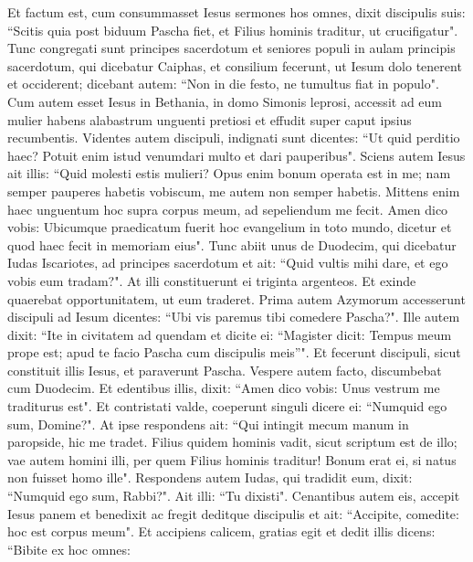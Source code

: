 \begin{biblechapter}  
\verse Et factum est, cum consummasset Iesus sermones hos omnes, dixit discipulis suis: 
\verse “Scitis quia post biduum Pascha fiet, et Filius hominis traditur, ut crucifigatur". 
\verse Tunc congregati sunt principes sacerdotum et seniores populi in aulam principis sacerdotum, qui dicebatur Caiphas, 
\verse et consilium fecerunt, ut Iesum dolo tenerent et occiderent; 
\verse dicebant autem: “Non in die festo, ne tumultus fiat in populo". 
\verse Cum autem esset Iesus in Bethania, in domo Simonis leprosi, 
\verse accessit ad eum mulier habens alabastrum unguenti pretiosi et effudit super caput ipsius recumbentis. 
\verse Videntes autem discipuli, indignati sunt dicentes: “Ut quid perditio haec? 
\verse Potuit enim istud venumdari multo et dari pauperibus".  
\verse Sciens autem Iesus ait illis: “Quid molesti estis mulieri? Opus enim bonum operata est in me; 
\verse nam semper pauperes habetis vobiscum, me autem non semper habetis. 
\verse Mittens enim haec unguentum hoc supra corpus meum, ad sepeliendum me fecit. 
\verse Amen dico vobis: Ubicumque praedicatum fuerit hoc evangelium in toto mundo, dicetur et quod haec fecit in memoriam eius". 
\verse Tunc abiit unus de Duodecim, qui dicebatur Iudas Iscariotes, ad principes sacerdotum 
\verse et ait: “Quid vultis mihi dare, et ego vobis eum tradam?". At illi constituerunt ei triginta argenteos. 
\verse Et exinde quaerebat opportunitatem, ut eum traderet. 
\verse Prima autem Azymorum accesserunt discipuli ad Iesum dicentes: “Ubi vis paremus tibi comedere Pascha?". 
\verse Ille autem dixit: “Ite in civitatem ad quendam et dicite ei: “Magister dicit: Tempus meum prope est; apud te facio Pascha cum discipulis meis”". 
\verse Et fecerunt discipuli, sicut constituit illis Iesus, et paraverunt Pascha. 
\verse Vespere autem facto, discumbebat cum Duodecim. 
\verse Et edentibus illis, dixit: “Amen dico vobis: Unus vestrum me traditurus est". 
\verse Et contristati valde, coeperunt singuli dicere ei: “Numquid ego sum, Domine?".  
\verse At ipse respondens ait: “Qui intingit mecum manum in paropside, hic me tradet. 
\verse Filius quidem hominis vadit, sicut scriptum est de illo; vae autem homini illi, per quem Filius hominis traditur! Bonum erat ei, si natus non fuisset homo ille". 
\verse Respondens autem Iudas, qui tradidit eum, dixit: “Numquid ego sum, Rabbi?". Ait illi: “Tu dixisti". 
\verse Cenantibus autem eis, accepit Iesus panem et benedixit ac fregit deditque discipulis et ait: “Accipite, comedite: hoc est corpus meum". 
\verse Et accipiens calicem, gratias egit et dedit illis dicens: “Bibite ex hoc omnes: 

\end{biblechapter}
